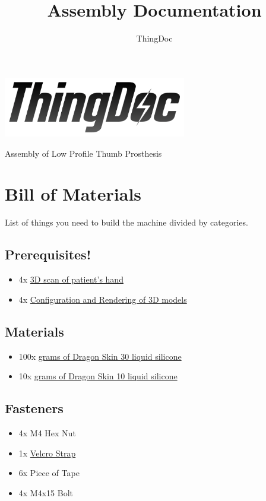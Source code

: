 \documentclass[11pt]{article}
\title{Assembly Documentation}
\author{ThingDoc}
\begin{document}
\maketitle
\begin{center}
\includegraphics[width=8cm]{logo.png}
\end{center}
Assembly of Low Profile Thumb Prosthesis

\newpage

\tableofcontents

\newpage

\section{Bill of Materials}
List of things you need to build the machine divided by categories.

\subsection{Prerequisites!}
\begin{itemize}
\item 4x \hyperlink{thing_hand\_scan}{3D scan of patient's hand}
\item 4x \hyperlink{thing_config\_file}{Configuration and Rendering of 3D models}
\end{itemize}

\subsection{Materials}
\begin{itemize}
\item 100x \hyperlink{thing_g\_dragon\_skin\_30}{grams of Dragon Skin 30 liquid silicone}
\item 10x \hyperlink{thing_g\_dragon\_skin\_10}{grams of Dragon Skin 10 liquid silicone}
\end{itemize}

\subsection{Fasteners}
\begin{itemize}
\item 4x M4 Hex Nut
\item 1x \hyperlink{thing_velcro\_strap}{Velcro Strap}
\item 6x Piece of Tape
\item 4x M4x15 Bolt
\end{itemize}
\end{document}
